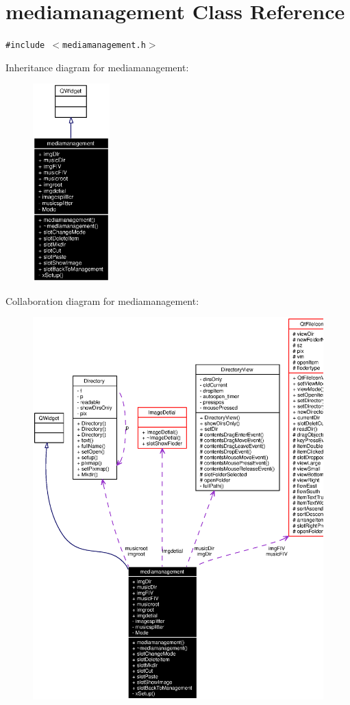 \section{mediamanagement Class Reference}
\label{classmediamanagement}
{\tt \#include $<$mediamanagement.h$>$}

Inheritance diagram for mediamanagement:\begin{figure}[H]
\begin{center}
\leavevmode
\includegraphics[width=84pt]{classmediamanagement__inherit__graph}
\end{center}
\end{figure}
Collaboration diagram for mediamanagement:\begin{figure}[H]
\begin{center}
\leavevmode
\includegraphics[width=320pt]{classmediamanagement__coll__graph}
\end{center}
\end{figure}


